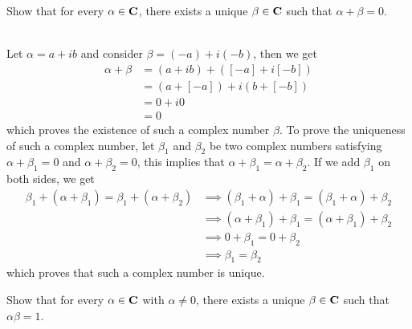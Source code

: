 \begin{exercise}
    Show that for every $\alpha \in \mathbf{C}$, there exists a unique $\beta \in \mathbf{C}$ such that $\alpha + \beta = 0$. \\
\end{exercise}

\begin{solution}
    \\ Let $\alpha = a + ib$ and consider $\beta = (-a) + i(-b)$, then we get
    \begin{align*}
        \alpha + \beta &= (a + ib) + ([-a] + i[-b]) \\
        &= (a + [-a]) + i(b + [-b]) \\
        &= 0 + i0 \\
        &= 0
    \end{align*}
    which proves the existence of such a complex number $\beta$. To prove the uniqueness of such a complex number, let $\beta_1$ and $\beta_2$ be two complex numbers satisfying $\alpha + \beta_1 = 0$ and $\alpha + \beta_2 = 0$, this implies that $\alpha + \beta_1 = \alpha + \beta_2$. If we add $\beta_1$ on both sides, we get
    \begin{align*}
        \beta_1 + (\alpha + \beta_1) = \beta_1 + (\alpha + \beta_2) &\implies (\beta_1 + \alpha) + \beta_1 = (\beta_1 + \alpha) + \beta_2 \\
        &\implies (\alpha + \beta_1) + \beta_1 = (\alpha + \beta_1) + \beta_2 \\
        &\implies 0 + \beta_1 = 0 + \beta_2 \\
        &\implies \beta_1 = \beta_2
    \end{align*}
    which proves that such a complex number is unique.\\
\end{solution}

\begin{exercise}
    Show that for every $\alpha \in \mathbf{C}$ with $\alpha \neq 0$, there exists a unique $\beta \in \mathbf{C}$ such that $\alpha \beta = 1$. \\
\end{exercise}

